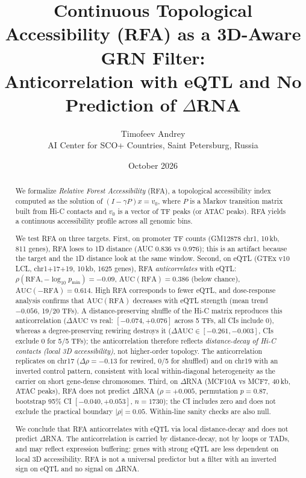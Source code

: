 \documentclass[11pt,a4paper]{article}
\title{Continuous Topological Accessibility (RFA) as a 3D-Aware GRN Filter: \\
Anticorrelation with eQTL and No Prediction of $\Delta$RNA}
\author{Timofeev Andrey \\
\small AI Center for SCO+ Countries, Saint Petersburg, Russia}
\date{October 2026}
\begin{document}
\maketitle

\begin{abstract}
We formalize \emph{Relative Forest Accessibility} (RFA), a topological accessibility index computed as the solution of $(I - \gamma P)x = v_0$, where $P$ is a Markov transition matrix built from Hi-C contacts and $v_0$ is a vector of TF peaks (or ATAC peaks). RFA yields a continuous accessibility profile across all genomic bins.

We test RFA on three targets. First, on promoter TF counts (GM12878 chr1, 10\,kb, 811 genes), RFA loses to 1D distance (AUC 0.836 vs 0.976); this is an artifact because the target and the 1D distance look at the same window. Second, on eQTL (GTEx v10 LCL, chr1+17+19, 10\,kb, 1625 genes), RFA \emph{anticorrelates} with eQTL: $\rho(\mathrm{RFA}, -\log_{10} p_{\min}) = -0.09$, $\mathrm{AUC}(\mathrm{RFA}) = 0.386$ (below chance), $\mathrm{AUC}(-\mathrm{RFA}) = 0.614$. High RFA corresponds to fewer eQTL, and dose-response analysis confirms that $\mathrm{AUC}(\mathrm{RFA})$ decreases with eQTL strength (mean trend $-0.056$, 19/20 TFs). A distance-preserving shuffle of the Hi-C matrix reproduces this anticorrelation ($\Delta\mathrm{AUC}$ vs real: $[-0.074, +0.076]$ across 5 TFs, all CIs include 0), whereas a degree-preserving rewiring destroys it ($\Delta\mathrm{AUC} \in [-0.261, -0.003]$, CIs exclude 0 for 5/5 TFs); the anticorrelation therefore reflects \emph{distance-decay of Hi-C contacts (local 3D accessibility)}, not higher-order topology. The anticorrelation replicates on chr17 ($\Delta\rho=-0.13$ for rewired, 0/5 for shuffled) and on chr19 with an inverted control pattern, consistent with local within-diagonal heterogeneity as the carrier on short gene-dense chromosomes. Third, on $\Delta$RNA (MCF10A vs MCF7, 40\,kb, ATAC peaks), RFA does not predict $\Delta$RNA ($\rho = +0.005$, permutation $p=0.87$, bootstrap 95\% CI $[-0.040, +0.053]$, $n=1730$); the CI includes zero and does not exclude the practical boundary $|\rho|=0.05$. Within-line sanity checks are also null.

We conclude that RFA anticorrelates with eQTL via local distance-decay and does not predict $\Delta$RNA. The anticorrelation is carried by distance-decay, not by loops or TADs, and may reflect expression buffering: genes with strong eQTL are less dependent on local 3D accessibility. RFA is not a universal predictor but a filter with an inverted sign on eQTL and no signal on $\Delta$RNA.
\end{abstract}
\end{document}

